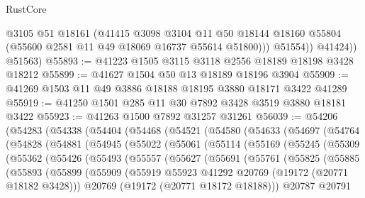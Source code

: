 \begin{lexlean}{RustCore}
\begin{coremodule}
                @3105
                @51
                @18161
                (@41415
                  @3098
                  @3104
                  @11
                  @50
                  @18144
                  @18160
                  @55804
                  (@55600 @2581 @11 @49 @18069 @16737 @55614 @51800)))
              @51554))
          @41424))
      @51563)
@55893 := @41223 @1505 @3115 @3118 @2556 @18189 @18198 @3428 @18212
@55899 := @41627 @1504 @50 @13 @18189 @18196 @3904
@55909 := @41269 @1503 @11 @49 @3886 @18188 @18195 @3880 @18171 @3422 @41289
@55919 := @41250 @1501 @285 @11 @30 @7892 @3428 @3519 @3880 @18181 @3422
@55923 := @41263 @1500 @7892 @31257 @31261
@56039 := @54206
    (@54283
      (@54338
        (@54404
          (@54468
            (@54521
              (@54580
                (@54633
                  (@54697
                    (@54764
                      (@54828
                        (@54881
                          (@54945
                            (@55022
                              (@55061
                                (@55114
                                  (@55169
                                    (@55245
                                      (@55309
                                        (@55362
                                          (@55426
                                            (@55493
                                              (@55557
                                                (@55627
                                                  (@55691
                                                    (@55761
                                                      (@55825
                                                        (@55885
                                                          (@55893
                                                            (@55899
                                                              (@55909
                                                                (@55919
                                                                  @55923
                                                                  @41292
                                                                  @20769
                                                                  (@19172 (@20771 @18182 @3428)))
                                                                @20769
                                                                (@19172 (@20771 @18172 @18188)))
                                                              @20787
                                                              @20791

\end{coremodule}
\end{lexlean}
